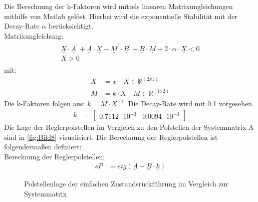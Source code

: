 Die Berechnung der k-Faktoren wird mittels linearen Matrixungleichungen mithilfe von Matlab gelöst. Hierbei wird die exponentielle Stabilität mit der Decay-Rate $\alpha$ berücksichtigt.\\
\newline
Matrixungleichung:
\begin{align}
        \begin{split}
        \underline{X}\cdot \underline{A}^'+\underline{A}\cdot\underline{X} -\underline{M}^'\cdot\underline{B}^' - \underline{B}\cdot \underline{M} +2\cdot\alpha\cdot \underline{X} < 0 \\
    \underline{X} > 0
    \end{split}
    \label{eq:Gleichung20}
\end{align}
\newline
mit:
\begin{align*}
    \underline{X} &= \underline{x} \quad X\in\mathbb{R}^{(2x1)}\\
    \underline{M} &= \underline{k}\cdot\underline{X} \quad M\in\mathbb{R}^{(1x2)}
\end{align*}
\newline
Die k-Faktoren folgen aus: $k = M\cdot X^{-1}$. Die Decay-Rate wird mit 0.1 vorgesehen.
\begin{align}
    k &= 
    \begin{bmatrix}
        0.7112\cdot 10^{-3} & 0.0094\cdot 10^{-3}
    \end{bmatrix}
    \label{eq:Gleichung21}
\end{align}
Die Lage der Reglerpolstellen im Vergleich zu den Polstellen der Systemmatrix A sind in \autoref{fig:Bild8} visualisiert. Die Berechnung der Reglerpolstellen ist folgendermaßen definiert:\\
\newline
Berechnung der Reglerpolstellen:
\begin{align*}
    sP &= eig\left(\underline{A}-\underline{B}\cdot\underline{k}\right)
\end{align*}

\begin{figure}[H]
   \centering
   \caption[Polstellenlage der einfache Zustandsrückführung]{Polstellenlage der einfachen Zustandsrückführung im Vergleich zur Systemmatrix}
   \label{fig:Bild8}
\end{figure}

